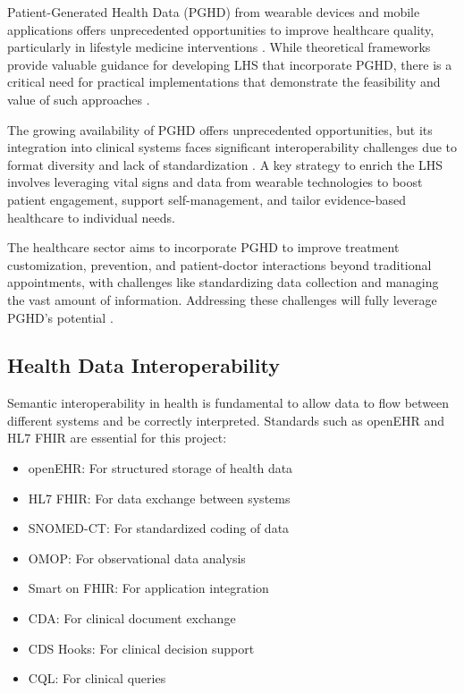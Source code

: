 Patient-Generated Health Data (PGHD) from wearable devices and mobile applications offers unprecedented opportunities to improve healthcare quality, particularly in lifestyle medicine interventions \cite{santos2023improving}. While theoretical frameworks provide valuable guidance for developing LHS that incorporate PGHD, there is a critical need for practical implementations that demonstrate the feasibility and value of such approaches \cite{santos2024improving}.

The growing availability of PGHD offers unprecedented opportunities, but its integration into clinical systems faces significant interoperability challenges due to format diversity and lack of standardization \cite{santos2024healthcare}. A key strategy to enrich the LHS involves leveraging vital signs and data from wearable technologies to boost patient engagement, support self-management, and tailor evidence-based healthcare to individual needs.

The healthcare sector aims to incorporate PGHD to improve treatment customization, prevention, and patient-doctor interactions beyond traditional appointments, with challenges like standardizing data collection and managing the vast amount of information. Addressing these challenges will fully leverage PGHD's potential \cite{vaidyam2022enabling}.

\subsection{Health Data Interoperability}

Semantic interoperability in health is fundamental to allow data to flow between different systems and be correctly interpreted. Standards such as openEHR and HL7 FHIR are essential for this project:

\begin{itemize}
\item openEHR: For structured storage of health data
\item HL7 FHIR: For data exchange between systems
\item SNOMED-CT: For standardized coding of data
\item OMOP: For observational data analysis
\item Smart on FHIR: For application integration
\item CDA: For clinical document exchange
\item CDS Hooks: For clinical decision support
\item CQL: For clinical queries
\end{itemize}

